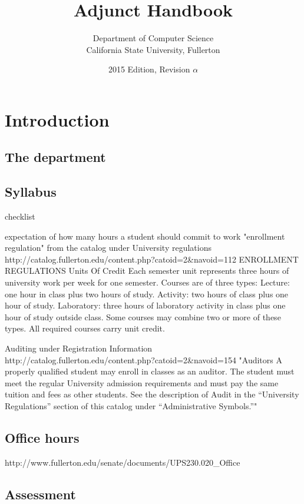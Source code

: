 \documentclass{book}
\begin{document}
\title{Adjunct Handbook}
\author{Department of Computer Science \\ California State University, Fullerton}
\date{2015 Edition, Revision $\alpha$}
\maketitle

\newpage
\tableofcontents

\chapter{Introduction}

\section{The department}

\section{Syllabus}
checklist

expectation of how many hours a student should commit to work
"enrollment regulation" from the catalog under University regulations
http://catalog.fullerton.edu/content.php?catoid=2&navoid=112
ENROLLMENT REGULATIONS
Units Of Credit
Each semester unit represents three hours of university work per week for one semester. Courses are of three types:
Lecture: one hour in class plus two hours of study.
Activity: two hours of class plus one hour of study.
Laboratory: three hours of laboratory activity in class plus one hour of study outside class.
Some courses may combine two or more of these types. All required courses carry unit credit.

Auditing
under Registration Information
http://catalog.fullerton.edu/content.php?catoid=2&navoid=154
"Auditors
A properly qualified student may enroll in classes as an auditor. The student must meet the regular University admission requirements and must pay the same tuition and fees as other students. See the description of Audit in the “University Regulations” section of this catalog under “Administrative Symbols.”"
\section{Office hours}
http://www.fullerton.edu/senate/documents/UPS230.020_Office%

\section{Assessment}
\end{document}
